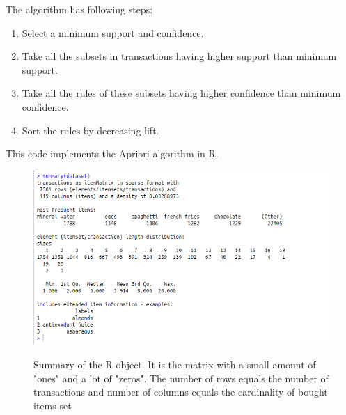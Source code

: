 \documentclass[runningheads,a4paper]{llncs}
\begin{document}
\bigskip

The algorithm has following steps:
\begin{enumerate}
\item Select a minimum support and confidence.
\item Take all the subsets in transactions having higher support than minimum support.
\item Take all the rules of these subsets having higher confidence than minimum confidence.
\item Sort the rules by decreasing lift.
\end{enumerate}

\lstset{basicstyle=\tiny}
This code implements the Apriori algorithm in R.
 

\begin{figure}[H]
\centering
\begin{center}
\includegraphics[scale=0.6]{pics/apriori_data}
\label{uloha1:pic1}
\caption{Summary of the R object. It is the matrix with a small amount of "ones" and a lot of "zeros". The number of rows equals the number of transactions and number of columns equals the cardinality of bought items set} 
\end{center}
\end{figure}
\end{document}
